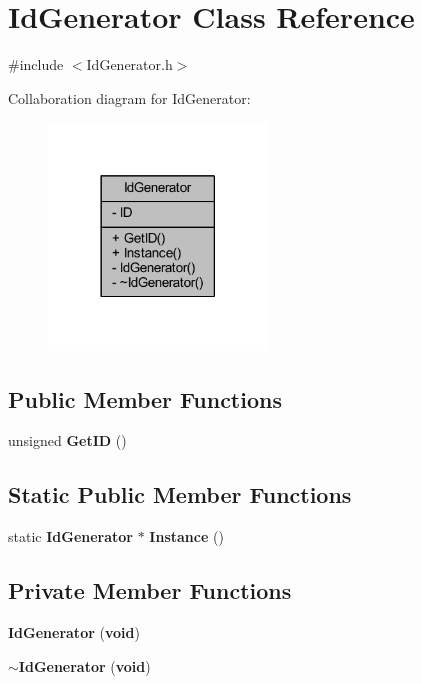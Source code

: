 \section{Id\+Generator Class Reference}
\label{class_id_generator}


{\ttfamily \#include $<$Id\+Generator.\+h$>$}



Collaboration diagram for Id\+Generator\+:\nopagebreak
\begin{figure}[H]
\begin{center}
\leavevmode
\includegraphics[width=165pt]{d6/ded/class_id_generator__coll__graph}
\end{center}
\end{figure}
\subsection*{Public Member Functions}
\begin{DoxyCompactItemize}
\item 
unsigned {\bf Get\+I\+D} ()
\end{DoxyCompactItemize}
\subsection*{Static Public Member Functions}
\begin{DoxyCompactItemize}
\item 
static {\bf Id\+Generator} $\ast$ {\bf Instance} ()
\end{DoxyCompactItemize}
\subsection*{Private Member Functions}
\begin{DoxyCompactItemize}
\item 
{\bf Id\+Generator} ({\bf void})
\item 
{\bf $\sim$\+Id\+Generator} ({\bf void})
\end{DoxyCompactItemize}
